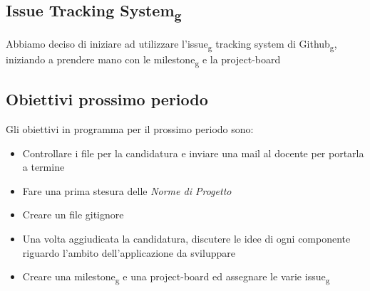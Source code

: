 \subsection{Issue Tracking System\textsubscript{g}}
Abbiamo deciso di iniziare ad utilizzare l'issue\textsubscript{g} tracking system di Github\textsubscript{g}, iniziando a prendere mano con le milestone\textsubscript{g} e la project-board

\subsection{Obiettivi prossimo periodo}
Gli obiettivi in programma per il prossimo periodo sono:
\begin{itemize}
\item Controllare i file per la candidatura e inviare una mail al docente per portarla a termine
\item Fare una prima stesura delle \textit{Norme di Progetto}
\item Creare un file gitignore
\item Una volta aggiudicata la candidatura, discutere le idee di ogni componente riguardo l'ambito dell'applicazione da sviluppare
\item Creare una milestone\textsubscript{g} e una project-board ed assegnare le varie issue\textsubscript{g}
\end{itemize}
